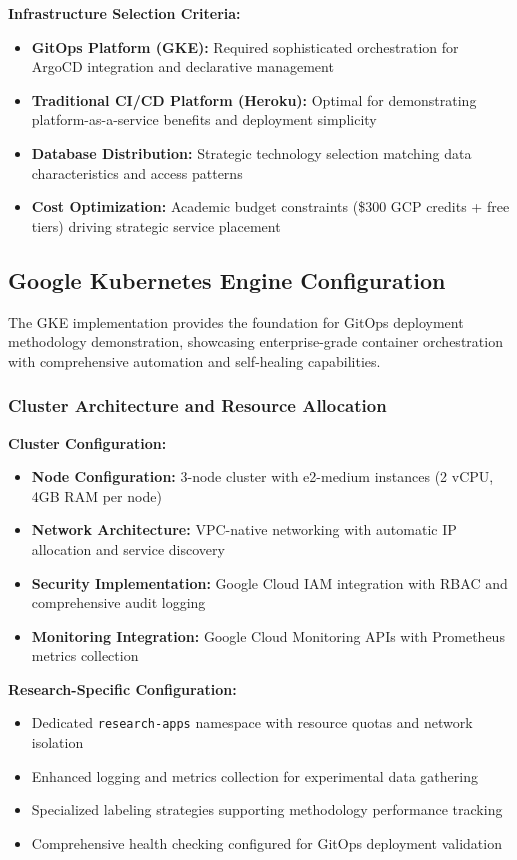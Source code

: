 \textbf{Infrastructure Selection Criteria:}
\begin{itemize}
\item \textbf{GitOps Platform (GKE):} Required sophisticated orchestration for ArgoCD integration and declarative management
\item \textbf{Traditional CI/CD Platform (Heroku):} Optimal for demonstrating platform-as-a-service benefits and deployment simplicity
\item \textbf{Database Distribution:} Strategic technology selection matching data characteristics and access patterns
\item \textbf{Cost Optimization:} Academic budget constraints (\$300 GCP credits + free tiers) driving strategic service placement
\end{itemize}

\subsection{Google Kubernetes Engine Configuration}

The GKE implementation provides the foundation for GitOps deployment methodology demonstration, showcasing enterprise-grade container orchestration with comprehensive automation and self-healing capabilities.

\subsubsection{Cluster Architecture and Resource Allocation}

\textbf{Cluster Configuration:}
\begin{itemize}
\item \textbf{Node Configuration:} 3-node cluster with e2-medium instances (2 vCPU, 4GB RAM per node)
\item \textbf{Network Architecture:} VPC-native networking with automatic IP allocation and service discovery
\item \textbf{Security Implementation:} Google Cloud IAM integration with RBAC and comprehensive audit logging
\item \textbf{Monitoring Integration:} Google Cloud Monitoring APIs with Prometheus metrics collection
\end{itemize}

\textbf{Research-Specific Configuration:}
\begin{itemize}
\item Dedicated \texttt{research-apps} namespace with resource quotas and network isolation
\item Enhanced logging and metrics collection for experimental data gathering
\item Specialized labeling strategies supporting methodology performance tracking
\item Comprehensive health checking configured for GitOps deployment validation
\end{itemize}

